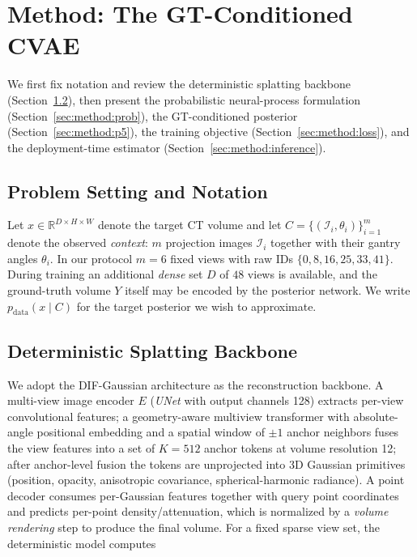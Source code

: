 
\section{Method: The GT-Conditioned CVAE}
\label{sec:method}

We first fix notation and review the deterministic splatting backbone
(Section~\ref{sec:method:backbone}), then present the probabilistic
neural-process formulation (Section~\ref{sec:method:prob}), the
GT-conditioned posterior (Section~\ref{sec:method:p5}), the training
objective (Section~\ref{sec:method:loss}), and the deployment-time
estimator (Section~\ref{sec:method:inference}).

\subsection{Problem Setting and Notation}
\label{sec:method:problem}

Let $x\in\mathbb{R}^{D\times H\times W}$ denote the target CT volume and
let $C=\{(\mathcal{I}_i,\theta_i)\}_{i=1}^{m}$ denote the observed
\emph{context}: $m$ projection images $\mathcal{I}_i$ together with
their gantry angles $\theta_i$. In our protocol $m=6$ fixed views with
raw IDs $\{0,8,16,25,33,41\}$. During training an additional
\emph{dense} set $D$ of $48$ views is available, and the ground-truth
volume $Y$ itself may be encoded by the posterior network. We write
$p_{\mathrm{data}}(x\mid C)$ for the target
posterior we wish to approximate.

\subsection{Deterministic Splatting Backbone}
\label{sec:method:backbone}

We adopt the DIF-Gaussian architecture \cite{lin2024difgaussian} as the
reconstruction backbone. A multi-view image encoder $E$ (\emph{UNet} with
output channels 128) extracts per-view convolutional features; a
geometry-aware multiview transformer with absolute-angle positional
embedding and a spatial window of $\pm1$ anchor neighbors fuses the view
features into a set of $K=512$ anchor tokens at volume resolution 12;
after anchor-level fusion the tokens are unprojected into 3D Gaussian
primitives (position, opacity, anisotropic covariance,
spherical-harmonic radiance). A point decoder consumes per-Gaussian
features together with query point coordinates and predicts per-point
density/attenuation, which is normalized by a \emph{volume rendering}
step to produce the final volume. For a fixed sparse view set, the
deterministic model computes

